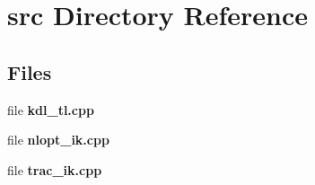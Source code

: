 \section{src Directory Reference}
\label{dir_68267d1309a1af8e8297ef4c3efbcdba}
\subsection*{Files}
\begin{DoxyCompactItemize}
\item 
file {\bfseries kdl\-\_\-tl.\-cpp}
\item 
file {\bfseries nlopt\-\_\-ik.\-cpp}
\item 
file {\bfseries trac\-\_\-ik.\-cpp}
\end{DoxyCompactItemize}
